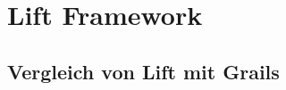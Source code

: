 \section{Lift Framework}\label{auswertung:lift}

\subsection{Vergleich von Lift mit Grails}\label{auswertung:groovy-lift}

